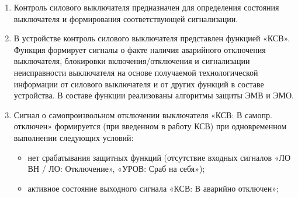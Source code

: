 
\color{black}

\begin{enumerate}

\item
Контроль силового выключателя предназначен для определения состояния выключателя и формирования соответствующей сигнализации. 

\item
В устройстве контроль силового выключателя представлен функцией «КСВ». Функция формирует сигналы о факте наличия аварийного отключения выключателя, блокировки включения/отключения и сигнализации неисправности выключателя на основе получаемой технологической информации от силового выключателя и от других функций в составе устройства. В составе функции реализованы алгоритмы защиты ЭМВ и ЭМО.

\item
Сигнал о самопроизвольном отключении выключателя «КСВ: В самопр. отключен» формируется (при введенном в работу КСВ) при одновременном выполнении следующих условий:
\begin{itemize}
\item нет срабатывания защитных функций (отсутствие входных сигналов «ЛО ВН / ЛО: Отключение», «УРОВ: Сраб на себя»);
\item активное состояние выходного сигнала «КСВ: В аварийно отключен»;
\end{itemize}


\end{enumerate}

